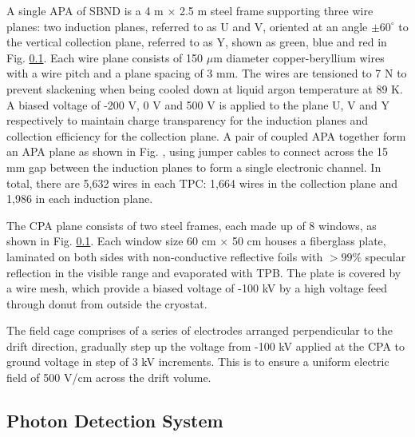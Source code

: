 A single APA of SBND is a 4 m $\times$ 2.5 m steel frame supporting three wire planes: two induction planes, referred to as U and V, oriented at an angle $\pm 60^{\circ}$ to the vertical collection plane, referred to as Y, shown as green, blue and red in Fig. \ref{}.
Each wire plane consists of 150 $\mu$m diameter copper-beryllium wires with a wire pitch and a plane spacing of 3 mm.
The wires are tensioned to 7 N to prevent slackening when being cooled down at liquid argon temperature at 89 K\cite{}.
A biased voltage of -200 V, 0 V and 500 V is applied to the plane U, V and Y respectively to maintain charge transparency for the induction planes and collection efficiency for the collection plane.
A pair of coupled APA together form an APA plane as shown in Fig. {}, using jumper cables to connect across the 15 mm gap between the induction planes to form a single electronic channel.
In total, there are 5,632 wires in each TPC: 1,664 wires in the collection plane and 1,986 in each induction plane.

The CPA plane consists of two steel frames, each made up of 8 windows, as shown in Fig. \ref{}.
Each window size 60 cm $\times$ 50 cm houses a fiberglass plate, laminated on both sides with non-conductive reflective foils with $> 99\%$ specular reflection in the visible range and evaporated with TPB.
The plate is covered by a wire mesh, which provide a biased voltage of -100 kV by a high voltage feed through donut from outside the cryostat. 

The field cage comprises of a series of electrodes arranged perpendicular to the drift direction, gradually step up the voltage from -100 kV applied at the CPA to ground voltage in step of 3 kV increments.
This is to ensure a uniform electric field of 500 V/cm across the drift volume.


\subsection{Photon Detection System}




